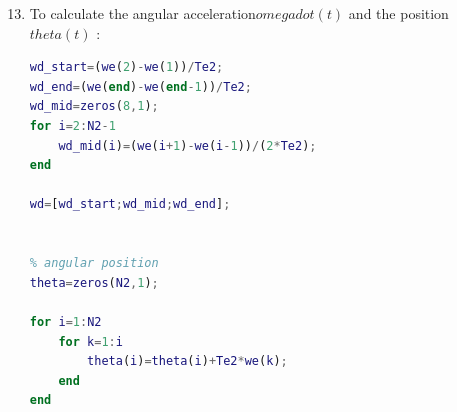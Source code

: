 \documentclass[a4paper,12pt]{article}
\begin{document}
\begin{enumerate}[label={\color{blue}\arabic*)}]
    \setcounter{enumi}{12}

    \item
    To calculate the angular acceleration\(omega dot(t)\) and the position \(theta(t)\) :
     \begin{lstlisting}[style=Matlab-editor,language=Matlab, basicstyle=\small\ttfamily]
% angular acceleration
wd_start=(we(2)-we(1))/Te2;
wd_end=(we(end)-we(end-1))/Te2;
wd_mid=zeros(8,1);
for i=2:N2-1
    wd_mid(i)=(we(i+1)-we(i-1))/(2*Te2);
end

wd=[wd_start;wd_mid;wd_end];


% angular position
theta=zeros(N2,1);

for i=1:N2
    for k=1:i
        theta(i)=theta(i)+Te2*we(k);
    end
end
        \end{lstlisting}


\end{enumerate}
\end{document}
